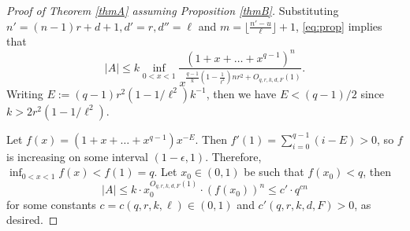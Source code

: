 \documentclass[10pt,a4paper]{amsart}
\begin{document}
\begin{proof}[Proof of Theorem \ref{thmA} assuming Proposition \ref{thmB}]
    
Substituting $n'= (n-1)r+d+1, d'=r, d''=\ell$ and $m = \lfloor {\frac{n'-u}{\ell}}\rfloor +1$, \eqref{eq:prop} implies that
\[
|A|\leq k \inf_{0<x<1}\frac{(1+x+\dots+x^{q-1})^n}{ x^{\frac{q-1}{k} \left( 1 - \frac{1}{\ell^2} \right) nr^2 + O_{q,r,k,d,F}(1) }}.
\]
Writing $E := (q-1)r^2(1-1/\ell^2)k^{-1}$, then we have $E <(q-1)/2$ since $k>2r^2(1-1/\ell^2)$.

Let $f(x) =(1+x+\dots+x^{q-1})x^{-E}$. Then $f'(1) = \sum_{i=0}^{q-1} (i-E) > 0$, so $f$ is increasing on some interval $(1-\epsilon,1)$. Therefore, $\inf_{0<x<1} f(x) < f(1) = q$. Let $x_0 \in (0,1)$ be such that $f(x_0) <q$, then
  \begin{equation*}
|A|  \leq k \cdot x_0^{O_{q,r,k,d,F}(1)} \cdot (f(x_0))^n \leq c' \cdot q^{cn} 
  \end{equation*}
for some constants $c = c(q,r,k,\ell) \in (0,1)$ and $c'(q,r,k,d,F) >0$, as desired.
\end{proof}
\end{document}
